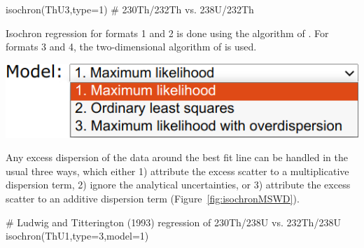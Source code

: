 \begin{refsection}
\begin{console}
isochron(ThU3,type=1) # 230Th/232Th vs. 238U/232Th
\end{console}

Isochron regression for formats 1 and 2 is done using the algorithm of
\citet{ludwig1994}. For formats 3 and 4, the two-dimensional algorithm
of \citet{york2004} is used.\\

\noindent\begin{minipage}[t]{.45\linewidth}
\strut\vspace*{-\baselineskip}\newline
\includegraphics[width=\linewidth]{../figures/PbPbIsochronModels.png}
\end{minipage}
\begin{minipage}[t]{.55\linewidth}
  Any excess dispersion of the data around the best fit line can be
  handled in the usual three ways, which either 1) attribute the
  excess scatter to a multiplicative dispersion term, 2) ignore the
  analytical uncertainties, or 3) attribute the excess scatter to an
  additive dispersion term (Figure~\ref{fig:isochronMSWD}).
\end{minipage}

\begin{script}
# Ludwig and Titterington (1993) regression of 230Th/238U vs. 232Th/238U
isochron(ThU1,type=3,model=1)
\end{script}


\end{refsection}
